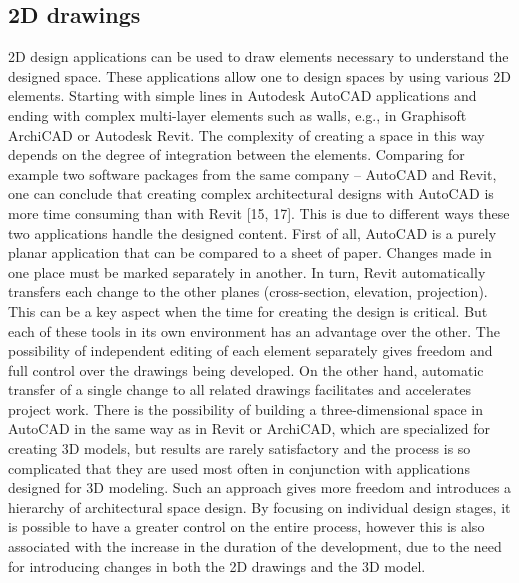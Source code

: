 \documentclass[runningheads]{llncs}
\begin{document}
\subsection{2D drawings}
2D design applications can be used to draw elements necessary to understand the designed space. These applications allow one to design spaces by using various 2D elements. Starting with simple lines in Autodesk AutoCAD applications and ending with complex multi-layer elements such as walls, e.g., in Graphisoft ArchiCAD or Autodesk Revit. The complexity of creating a space in this way depends on the degree of integration between the elements.  Comparing for example two software packages from the same company -- AutoCAD and Revit, one can conclude that creating complex architectural designs with AutoCAD is more time consuming than with Revit [15, 17]. This is due to  different ways these two applications handle the designed content. First of all, AutoCAD is a purely planar application that can be compared to a sheet of paper. Changes made in one place must be marked separately in another. In turn, Revit automatically transfers each change to the other planes (cross-section, elevation, projection). This can be a key aspect when the time for creating the design is critical. But each of these tools in its own environment has an advantage over the other. The possibility of independent editing of each element separately gives freedom and full control over the drawings being developed. On the other hand, automatic transfer of a single change to all related drawings facilitates and accelerates project work. There is the possibility of building a three-dimensional space in AutoCAD in the same way as in Revit or ArchiCAD, which are specialized for creating 3D models, but results are rarely satisfactory and the process is so complicated that they are used most often in conjunction with applications designed for 3D modeling. Such an approach gives more freedom and introduces a hierarchy of architectural space design. By focusing on individual design stages, it is possible to have a greater control on the entire process, however this is also associated with the increase in the duration of the development, due to the need for introducing changes in both the 2D drawings and the 3D model.
\end{document}
